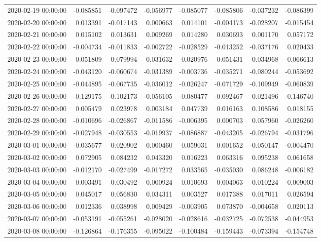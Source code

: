 \begin{tabular}{lrrrrrrr}
2020-02-19 00:00:00 & -0.085851 & -0.097472 & -0.056977 & -0.085077 & -0.085806 & -0.037232 & -0.086399 \\
2020-02-20 00:00:00 & 0.013391 & -0.017143 & 0.000663 & 0.014101 & -0.004173 & -0.028207 & -0.015454 \\
2020-02-21 00:00:00 & 0.015102 & 0.013631 & 0.009269 & 0.014280 & 0.030693 & 0.001170 & 0.057172 \\
2020-02-22 00:00:00 & -0.004734 & -0.011833 & -0.002722 & -0.028529 & -0.013252 & -0.037176 & 0.020433 \\
2020-02-23 00:00:00 & 0.051809 & 0.079994 & 0.031632 & 0.020976 & 0.051431 & 0.034968 & 0.066613 \\
2020-02-24 00:00:00 & -0.043120 & -0.060674 & -0.031389 & -0.003736 & -0.035271 & -0.080244 & -0.053692 \\
2020-02-25 00:00:00 & -0.044895 & -0.067735 & -0.036012 & -0.026247 & -0.071729 & -0.109949 & -0.060839 \\
2020-02-26 00:00:00 & -0.129175 & -0.102173 & -0.056105 & -0.080477 & -0.092467 & 0.021496 & -0.146740 \\
2020-02-27 00:00:00 & 0.005479 & 0.023978 & 0.003184 & 0.047739 & 0.016163 & 0.108586 & 0.018155 \\
2020-02-28 00:00:00 & -0.010696 & -0.026867 & -0.011586 & -0.006395 & 0.000703 & 0.057960 & -0.026260 \\
2020-02-29 00:00:00 & -0.027948 & -0.030553 & -0.019937 & -0.086887 & -0.043205 & -0.026794 & -0.031796 \\
2020-03-01 00:00:00 & -0.035677 & 0.020902 & 0.000460 & 0.059031 & 0.001652 & -0.050147 & -0.004470 \\
2020-03-02 00:00:00 & 0.072905 & 0.084232 & 0.043320 & 0.016223 & 0.063316 & 0.095238 & 0.061658 \\
2020-03-03 00:00:00 & -0.012170 & -0.027499 & -0.017272 & 0.033565 & -0.035030 & 0.086248 & -0.006182 \\
2020-03-04 00:00:00 & 0.003491 & -0.030492 & 0.000924 & 0.010693 & 0.004063 & 0.010224 & -0.009003 \\
2020-03-05 00:00:00 & 0.045017 & 0.056830 & 0.034311 & 0.003527 & 0.017388 & 0.017011 & 0.026594 \\
2020-03-06 00:00:00 & 0.012336 & 0.038998 & 0.009429 & -0.003905 & 0.073870 & -0.004658 & 0.020113 \\
2020-03-07 00:00:00 & -0.053191 & -0.055261 & -0.028020 & -0.028616 & -0.032725 & -0.072538 & -0.044953 \\
2020-03-08 00:00:00 & -0.126864 & -0.176355 & -0.095022 & -0.100484 & -0.159443 & -0.073394 & -0.154748 \\

\end{tabular}
